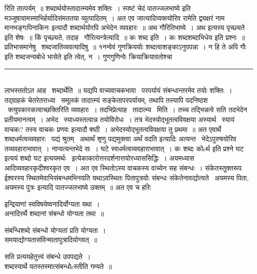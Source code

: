\documentclass[11pt, openany]{book}
\begin{document}
\begin{multicols}{2}
\noindent
रिति तात्पर्यम्~॥ शब्दार्थयोस्तादात्म्यमेव शक्तिः~। स्पष्टं चेदं पातज्जलभाष्ये इति मञ्जूषायामस्माभिर्हर्यादिसंमततया व्युत्पादितम्~। अत एव जात्यादिव्यक्त्योरिव {\qt रामेति द्व्यक्षरं नाम मानभङ्गःपिनाकिनः} इत्यादौ शब्दार्थयोरपि अभेदेन व्यवहारः~॥ अथ गौरितिभाष्ये~। अथ इत्यस्य {\qt पृच्छ्यते} इति शेषः~॥ किं पृच्छ्यते, तदाह \textendash\ गौरित्यन्त्रेत्यादि~॥ कः शब्द इति~। कः शब्दशब्दाभिधेय इति प्रश्नः~॥ प्रतिभासमानेषु \textendash\ शब्दजातिव्यवत्यादिषु~॥ १नन्वेवं गुणक्रिययोः शब्दत्वाशङ्काऽनुपपन्ना~। न हि ते अपि {\qt गौः इति शब्दजन्यबोधे} भासेते इति त्वेत्, न~। गुणगुणिनोः क्रियाक्रियावतोश्चा \textendash\ 

\noindent
\rule{1\linewidth}{0.5pt}\\

\noindent
लाभस्ततोऽत आह \textendash\ शब्दार्थेति~॥ यद्यपि वाच्यवाचकभावा \textendash\ परपर्यायं संबन्धान्तरमेव तयोः शक्तिः~। तद्ग्राहकं चेतरेतराध्या \textendash\ समूलकं तादात्म्यं सङ्केतापरपर्यायम्, तथापि तस्यापि पदनिष्ठश \textendash\ क्त्युपकारकत्वाच्छक्तिरिति व्यवहारः~। तदभिप्रेत्याह \textendash\ तादात्म्य \textendash\ मिति~। तच्च तद्भिन्नत्वे सति तदभेदेन प्रतीयमानत्वम्~। अभेद \textendash\ स्याध्यस्तत्वान्न तयोविरोधः~। तत्र भेदस्योद्भूतत्वविवक्षया अस्यार्थ \textendash\ स्यायं वाचकः? {\qt तस्य वाचकः प्रणवः} इत्यादौ षष्ठी~। अभेदस्योद्भूतत्वविवक्षया तु प्रथमा~॥ अत एवार्थे शब्दधर्मत्वव्यवहारः \textendash\ {\qt पद्यं श्रुतम्} \textendash\ अथार्थं शृणु {\qt पद्यमुक्त्वा अर्थं वदति} इत्यादिः अत्यन्त \textendash\ भेदेऽपुरुषयोरिव तव्यवहाराभावात्~। नाप्यत्यन्तभेदे सः~। घटे स्वधर्मत्वव्यवहाराभावात्~। कः शब्दः कोsर्थ इति प्रश्ने घट इत्ययं शब्दो घट इत्ययमर्थः \textendash\ इत्येकाकारोत्तरदर्शनात्तयोरध्याससिद्धिः~। अयमध्यास आदिव्यवहारकृदीश्वरकृत एव~। अत एव {\qt स्थितोऽस्य} वाचकस्य वाच्येन सह संबन्धः~। संकेतस्तूक्तरूप ईश्वरस्य स्थितमेवाभिसंबन्धमभिनयति यथाऽवस्थितः पितापुत्रयोः संबन्धः संकेतेनावद्योत्यते \textendash\ अयमस्य पिता, अयमस्य पुत्रः इत्यादि पातज्जलभाष्ये उक्तम्~॥ अत एव च हरिः \textendash\

\begin{quote}
{\qt }
\end{quote}
इन्द्रियाणां स्वविषयेष्वनादिर्योग्यता यथा~।\\
अनादिरर्थै शब्दानां संबन्धो योग्यता तथा~॥

संबन्धिशब्दे संबन्धो योग्यतां प्रति योग्यता~।\\
समयाद्योग्यतासंविन्मातापुत्रादियोगवत्~॥

सति प्रत्ययहेतुत्त्वं संबन्धे उपपद्यते~।\\
शब्दस्यार्थे यतस्तस्मात्संबन्धोsस्तीति गम्यते~॥


\end{multicols}
\end{document}

